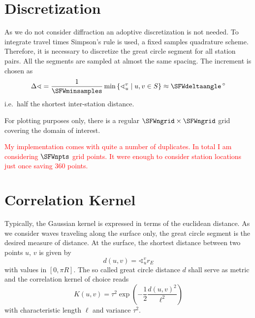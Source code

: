 \documentclass[11pt]{article}
\newcommand\worries[1]{\textcolor{red}{#1}}
\begin{document}
\section{Discretization}

As we do not consider diffraction an adoptive discretization is not needed.
To integrate travel times Simpson's rule is used, a fixed samples quadrature scheme.
Therefore, it is necessary to discretize the great circle segment for all station pairs.
All the segments are sampled at almost the same spacing.
The increment is chosen as
\begin{equation}
    \Delta\sphericalangle = \frac 1 \SFWminsamples \min\left\{ \sphericalangle_u^v \mid u,v \in S \right\}
    \approx \SFWdeltaangle \,{}^\circ
\end{equation}
i.e.~half the shortest inter-station distance.

For plotting purposes only, there is a regular $\SFWngrid \times \SFWngrid$ grid covering the domain of interest.

\worries{My implementation comes with quite a number of duplicates.
In total I am considering $\SFWnpts$ grid points.
It were enough to consider station locations just once saving 360 points.}


\section{Correlation Kernel}

Typically, the Gaussian kernel is expressed in terms of the euclidean distance.
As we consider waves traveling along the surface only, the great circle segment is the desired measure of distance.
At the surface, the shortest distance between two points $u$, $v$ is given by
\begin{equation}
    d(u,v) = \sphericalangle_u^v r_E
\end{equation}
with values in $[0, \pi R]$.
The so called great circle distance $d$ shall serve as metric and the correlation kernel of choice reads
\begin{equation}
    K(u,v) = \tau^2 \exp\!\left(-\frac 12 \frac{d(u,v)^2}{\ell^2}\right)
\end{equation}
with characteristic length $\ell$ and variance $\tau^2$.
\end{document}
